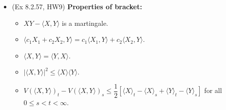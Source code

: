 \documentclass[twoside]{article}
\begin{document}
\begin{itemize}
\item (Ex 8.2.57, HW9) \textbf{Properties of bracket:}
\begin{itemize}
\item $XY - \langle X, Y \rangle$ is a martingale.
\item $\langle c_1X_1 + c_2 X_2, Y \rangle = c_1\langle X_1, Y \rangle + c_2\langle X_2, Y \rangle$.
\item $\langle X, Y \rangle = \langle Y, X \rangle$.
\item $|\langle X, Y \rangle|^2 \leq \langle X \rangle \langle Y \rangle$.
\item $V(\langle X, Y \rangle)_t - V(\langle X, Y \rangle)_s \leq \dfrac{1}{2}[\langle X \rangle_t - \langle X \rangle_s + \langle Y \rangle_t - \langle Y \rangle_s]$ for all $0 \leq s < t < \infty$.
\end{itemize}

\end{itemize}
\end{document}
